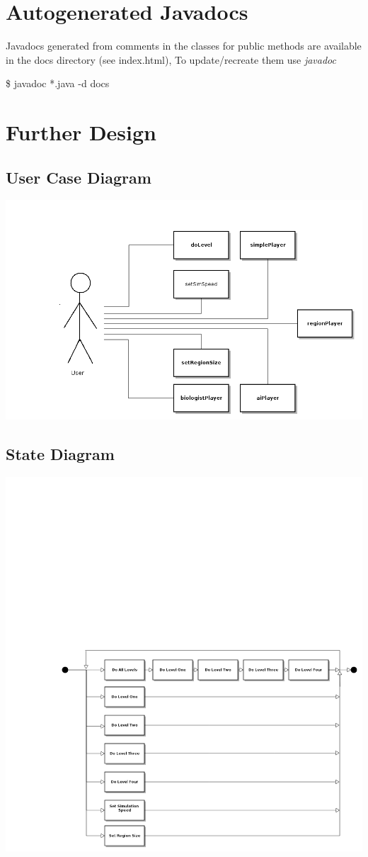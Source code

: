 \documentclass[pdftex,12pt,a4paper]{article}
\begin{document}
	\section{Autogenerated Javadocs}
		Javadocs generated from comments in the classes for public methods are available in the docs directory (see index.html), To update/recreate them use \emph{javadoc}

		\$ javadoc *.java -d docs
	\section{Further Design}
		\subsection{User Case Diagram}
			\includegraphics[width=\linewidth]{./fig3.png}
		\subsection{State Diagram}
			\includegraphics[width=\linewidth]{./fig4.png}
\end{document}
